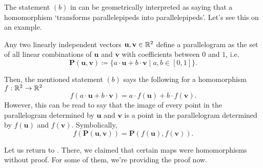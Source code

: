\begin{remark}{}{}
 The statement $(b)$ in  can be
 geometrically interpreted as saying that a homomorphism `transforms
 parallelepipeds into parallelepipeds'. Let's see this on an example.

 Any two linearly independent vectors $\mathbf{u},\mathbf{v} \in \mathbb{R}^2$ define a
 parallelogram as the set of all linear combinations of $\mathbf{u}$ and
 $\mathbf{v}$ with coefficients between $0$ and $1$, i.e.
 \[
  \mathbf{P}(\mathbf{u},\mathbf{v}) \coloneqq \{a \cdot \mathbf{u} + b \cdot
  \mathbf{v} \mid a,b \in [0,1]\}.
 \]
 \begin{center}
 \end{center}
 Then, the mentioned statement $(b)$ says the following for a homomorphism
 $f:\mathbb{R}^2 \to \mathbb{R}^2$
 \[
  f(a \cdot \mathbf{u} + b \cdot \mathbf{v}) = a \cdot f(\mathbf{u}) + b \cdot
  f(\mathbf{v}).
 \]
 However, this can be read to say that the image of every point in the
 parallelogram determined by $\mathbf{u}$ and $\mathbf{v}$ is a point in the
 parallelogram determined by $f(\mathbf{u})$ and $f(\mathbf{v})$. Symbolically,
 \[
  f(\mathbf{P}(\mathbf{u},\mathbf{v})) =
  \mathbf{P}(f(\mathbf{u}),f(\mathbf{v})).
 \]
\end{remark}

Let us return to . There, we claimed that certain maps
were homomorphisms without proof. For some of them, we're providing the proof
now.

